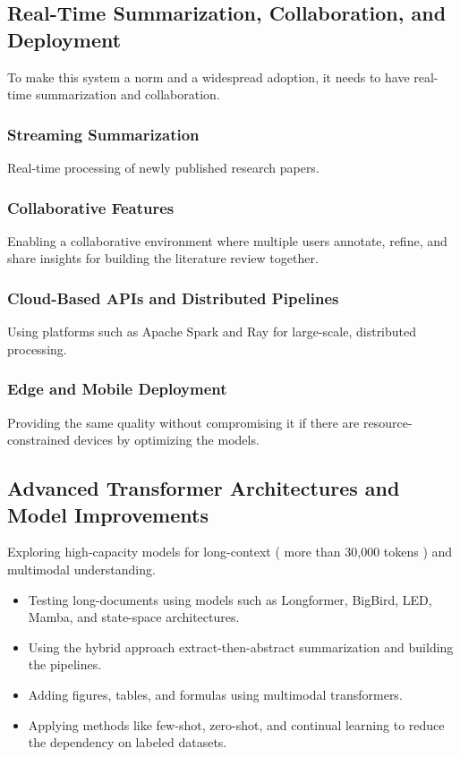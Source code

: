 \documentclass[conference]{IEEEtran}
\begin{document}
\subsection{Real-Time Summarization, Collaboration, and Deployment}
To make this system a norm and a widespread adoption, it needs to have real-time summarization and collaboration.

\subsubsection{Streaming Summarization}
Real-time processing of newly published research papers.

\subsubsection{Collaborative Features}
Enabling a collaborative environment where multiple users annotate, refine, and share insights for building the literature review together.

\subsubsection{Cloud-Based APIs and Distributed Pipelines}
Using platforms such as Apache Spark and Ray for large-scale, distributed processing.

\subsubsection{Edge and Mobile Deployment}
Providing the same quality without compromising it if there are resource-constrained devices by optimizing the models.

\subsection{Advanced Transformer Architectures and Model Improvements}
Exploring high-capacity models for long-context ( more than 30,000 tokens ) and multimodal understanding.

\begin{itemize}
    \item Testing long-documents using models such as Longformer, BigBird, LED, Mamba, and state-space architectures.
    \item Using the hybrid approach extract-then-abstract summarization and building the pipelines.
    \item Adding figures, tables, and formulas using multimodal transformers.
    \item Applying methods like few-shot, zero-shot, and continual learning to reduce the dependency on labeled datasets.
\end{itemize}
\end{document}
